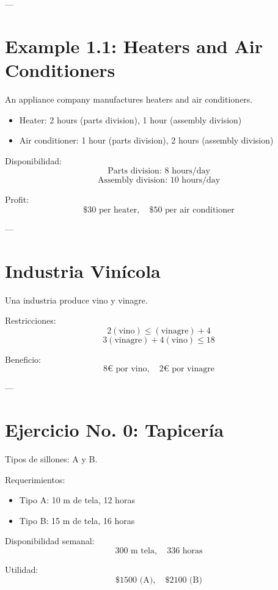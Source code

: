 \documentclass[12pt]{article}
\begin{document}
---

\section*{Example 1.1: Heaters and Air Conditioners}

An appliance company manufactures heaters and air conditioners.

\begin{itemize}
\item Heater: 2 hours (parts division), 1 hour (assembly division)
\item Air conditioner: 1 hour (parts division), 2 hours (assembly division)
\end{itemize}

Disponibilidad:
\[
\text{Parts division: } 8 \text{ hours/day}
\]
\[
\text{Assembly division: } 10 \text{ hours/day}
\]

Profit:
\[
\$30 \text{ per heater}, \quad \$50 \text{ per air conditioner}
\]

---

\section*{Industria Vinícola}

Una industria produce vino y vinagre.

Restricciones:
\[
2(\text{vino}) \leq (\text{vinagre}) + 4
\]
\[
3(\text{vinagre}) + 4(\text{vino}) \leq 18
\]

Beneficio:
\[
8€ \text{ por vino}, \quad 2€ \text{ por vinagre}
\]

---

\section*{Ejercicio No. 0: Tapicería}

Tipos de sillones: A y B.

Requerimientos:

\begin{itemize}
\item Tipo A: 10 m de tela, 12 horas
\item Tipo B: 15 m de tela, 16 horas
\end{itemize}

Disponibilidad semanal:
\[
300 \text{ m tela}, \quad 336 \text{ horas}
\]

Utilidad:
\[
\$1500 \text{ (A)}, \quad \$2100 \text{ (B)}
\]
\end{document}
